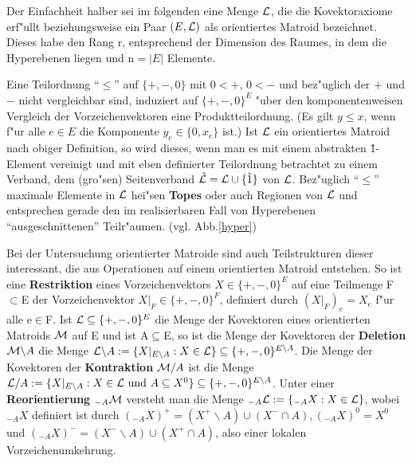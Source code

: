 Der Einfachheit halber sei im folgenden eine Menge ${\cal L}$, die die
Kovektoraxiome erf"ullt beziehungsweise ein Paar $(E,{\cal L})$ als
orientiertes Matroid bezeichnet. Dieses habe den Rang r, entsprechend der
Dimension des Raumes, in dem die Hyperebenen liegen und n$=|E|$ Elemente.

Eine Teilordnung "`$\leq$"' auf $\{+,-,0\}$ mit $0<+$, $0<-$ und bez"uglich
der $+$ und $-$ nicht vergleichbar sind, induziert auf $\{+,-,0\}^E$ "uber
den komponentenweisen Vergleich der Vorzeichenvektoren eine Produktteilordnung.
(Es gilt $y\leq x$, wenn f"ur alle $e\in E$ die Komponente $y_e\in\{0,x_e\}$
ist.) Ist ${\cal L}$ ein orientiertes Matroid nach obiger Definition, so wird
dieses, wenn man es mit einem abstrakten \^1-Element vereinigt und mit
eben definierter Teilordnung betrachtet zu einem Verband, dem (gro"sen)
Seitenverband $\hat{\cal L}={\cal L}\cup \{\hat{1}\}$ von
$\cal L$. Bez"uglich "`$\leq$"' maximale Elemente in $\cal L$ hei"sen
{\bf Topes} oder auch Regionen von
$\cal L$ und entsprechen gerade den im realisierbaren Fall von Hyperebenen
"`ausgeschnittenen"' Teilr"aumen. (vgl. Abb.\ref{hyper})

Bei der Untersuchung orientierter Matroide sind auch Teilstrukturen dieser
interessant, die aus Operationen auf einem orientierten Matroid entstehen. So
ist eine {\bf Restriktion} eines Vorzeichenvektors
$X\in\{+,-,0\}^E$ auf eine Teilmenge F$\subset$E der Vorzeichenvektor
$X|_F\in\{+,-,0\}^F$, definiert durch $(X|_F)_e=X_e$ f"ur alle e$\in$F. Ist
${\cal L}\subseteq\{+,-,0\}^E$
die Menge der Kovektoren eines orientierten Matroids $\cal M$ auf E und ist
A$\subseteq$E, so ist die Menge der Kovektoren der {\bf Deletion}
${\cal M}\backslash A$ die Menge ${\cal L}\backslash A
:=\{X|_{E\backslash A}:X\in{\cal L}\}\subseteq\{+,-,0\}^{E\backslash A}$.
Die Menge der Kovektoren der {\bf Kontraktion} ${\cal M}/A$
ist die Menge ${\cal L}/ A:=\{X|_{E\backslash A}:X\in{\cal L}\mbox{ und }
A\subseteq X^0\}\subseteq\{+,-,0\}^{E\backslash A}$.
Unter einer {\bf Reorientierung} $_{-A}{\cal M}$ versteht
man die Menge $_{-A}{\cal L}:=\{_{-A}X:X\in{\cal L}\}$, wobei $_{-A}X$ definiert
ist durch $(_{-A}X)^+=(X^+\backslash A)\cup (X^-\cap A), (_{-A}X)^0=X^0$ und
$(_{-A}X)^-=(X^-\backslash A)\cup (X^+\cap A)$, also einer lokalen
Vorzeichenumkehrung.

